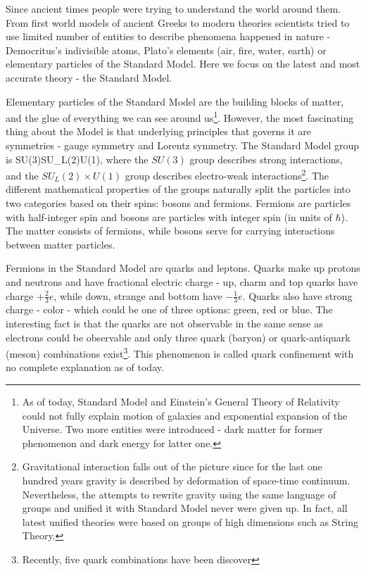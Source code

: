 Since ancient times people were trying to understand the world around them. From 
first world models of ancient Greeks to modern theories scientists tried to use 
limited number of entities to describe phenomena happened in nature - Democritus's 
indivisible atoms, Plato's elements (air, fire, water, earth) or elementary particles 
of the Standard Model. Here we focus on the latest and most accurate theory - the
Standard Model.

Elementary particles of the Standard Model are the building blocks of matter, and the glue of everything we
can see around us\footnote{As of today, Standard Model and Einstein's General Theory of 
Relativity could not fully explain motion of galaxies and exponential expansion of the Universe. 
Two more entities were introduced - dark matter for former phenomenon and dark energy 
for latter one.}. However, the most fascinating thing about the Model is that underlying 
principles that governs it are symmetries - gauge symmetry and Lorentz 
symmetry. The Standard Model group is 
\be
SU(3)\times SU_L(2)\times U(1),
\ee 
where the $SU(3)$ group describes strong interactions, and the $SU_L(2)\times U(1)$ group describes 
electro-weak interactions\footnote{Gravitational interaction falls out of the picture
since for the last one hundred years gravity is described by deformation of space-time 
continuum. Nevertheless, the attempts to rewrite gravity using the same language of groups
and unified it with Standard Model never were given up. In fact, all latest unified theories 
were based on groups of high dimensions such as
String Theory.}. The different mathematical properties of the groups naturally split
the particles into two categories based on their spins: bosons and fermions. Fermions are 
particles with half-integer spin and bosons are particles with integer spin (in units of $\hbar$). 
The matter consists of fermions, while bosons serve for carrying interactions between matter particles.

Fermions in the Standard Model are quarks and leptons. Quarks make up protons
and neutrons and have fractional electric charge - up, charm and top quarks have charge $+\frac{2}{3}e$, 
while down, strange and bottom have $-\frac{1}{3}e$. Quarks also have strong charge - color -
which could be one of three options: green, red or blue. The interesting fact is that the quarks
are not observable in the same sense as electrons could be observable and only three quark (baryon) or 
quark-antiquark (meson) combinations exist\footnote{Recently, five quark combinations have been discover}. 
This phenomenon is called quark confinement with no complete explanation as of today. 

